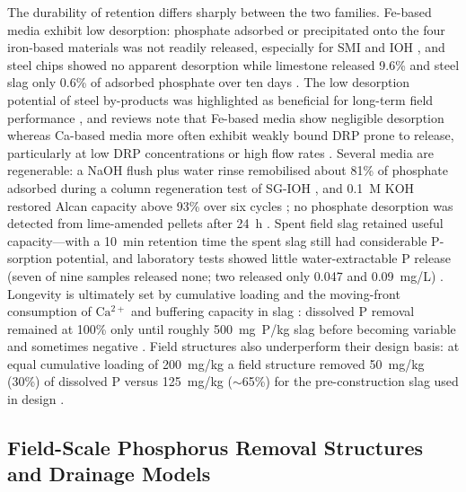 \documentclass[11pt]{article}
\begin{document}
The durability of retention differs sharply between the two families. Fe-based
media exhibit low desorption: phosphate adsorbed or precipitated onto the four
iron-based materials was not readily released, especially for SMI and IOH
\parencite{Allred2014}, and steel chips showed no apparent desorption while
limestone released 9.6\% and steel slag only 0.6\% of adsorbed phosphate over ten
days \parencite{Sellner2019b}. The low desorption potential of steel by-products
was highlighted as beneficial for long-term field performance
\parencite{Sellner2019b}, and reviews note that Fe-based media show negligible
desorption whereas Ca-based media more often exhibit weakly bound DRP prone to
release, particularly at low DRP concentrations or high flow rates
\parencite{Mendes2022}. Several media are regenerable: a NaOH flush plus water
rinse remobilised about 81\% of phosphate adsorbed during a column regeneration
test of SG-IOH \parencite{Allred2017}, and 0.1~M KOH restored Alcan capacity above
93\% over six cycles \parencite{Kumari2025}; no phosphate desorption was detected
from lime-amended pellets after 24~h \parencite{Li2017}. Spent field slag retained
useful capacity---with a 10~min retention time the spent slag still had
considerable P-sorption potential, and laboratory tests showed little
water-extractable P release (seven of nine samples released none; two released
only 0.047 and 0.09~mg/L) \parencite{Shedekar2020}. Longevity is ultimately set by
cumulative loading and the moving-front consumption of $\mathrm{Ca^{2+}}$ and
buffering capacity in slag \parencite{Wang2020d}: dissolved P removal remained at
100\% only until roughly 500~mg~P/kg slag before becoming variable and sometimes
negative \parencite{Penn2020}. Field structures also underperform their design
basis: at equal cumulative loading of 200~mg/kg a field structure removed
50~mg/kg (30\%) of dissolved P versus 125~mg/kg ($\sim$65\%) for the
pre-construction slag used in design \parencite{Shedekar2020}.

\subsection{Field-Scale Phosphorus Removal Structures and Drainage Models}
\end{document}
